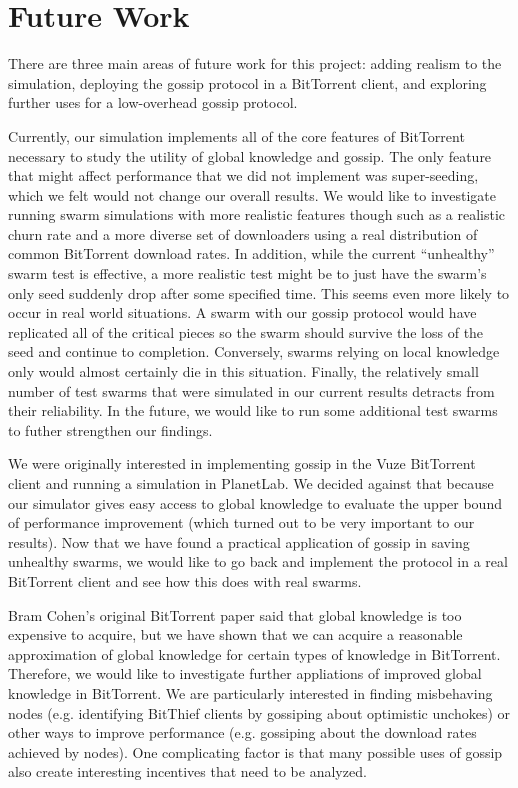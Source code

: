 \section{Future Work}

There are three main areas of future work for this project: adding realism 
to the simulation, deploying the gossip protocol in a BitTorrent client,
and exploring further uses for a low-overhead gossip protocol. 

Currently, our simulation implements all of the core features of
BitTorrent necessary to study the utility of global knowledge and
gossip. The only feature that might affect performance that we did not
implement was super-seeding, which we felt would not change our overall
results. We would like to investigate running swarm simulations with
more realistic features though such as a realistic churn rate and a more
diverse set of downloaders using a real distribution of common BitTorrent
download rates. In addition, while the current ``unhealthy'' swarm test is
effective, a more realistic test might be to just have the swarm's only
seed suddenly drop after some specified time. This seems even more likely to
occur in real world situations. A swarm with our gossip protocol would have
replicated all of the critical pieces so the swarm should survive the loss of
the seed and continue to completion. Conversely, swarms relying on local 
knowledge only would almost certainly die in this situation. Finally, the
relatively small number of test swarms that were simulated in our current
results detracts from their reliability. In the future, we would like
to run some additional test swarms to futher strengthen our findings.

We were originally interested in implementing gossip in the Vuze BitTorrent client
and running a simulation in PlanetLab. We decided against that because our simulator
gives easy access to global knowledge to evaluate the upper bound of performance improvement
(which turned out to be very important to our results). Now that we have found a practical
application of gossip in saving unhealthy swarms, we would like to go back and implement
the protocol in a real BitTorrent client and see how this does with real swarms.


Bram Cohen's original BitTorrent paper said that global knowledge is too expensive to acquire,
but we have shown that we can acquire a reasonable approximation of global knowledge
for certain types of knowledge in BitTorrent. Therefore, we would like to investigate
further appliations of improved global knowledge in BitTorrent. We are particularly interested in 
finding misbehaving nodes (e.g. identifying BitThief clients by gossiping about optimistic unchokes)
or other ways to improve performance (e.g. gossiping about the download rates achieved by nodes).
One complicating factor is that many possible uses of gossip also create interesting incentives
that need to be analyzed.

